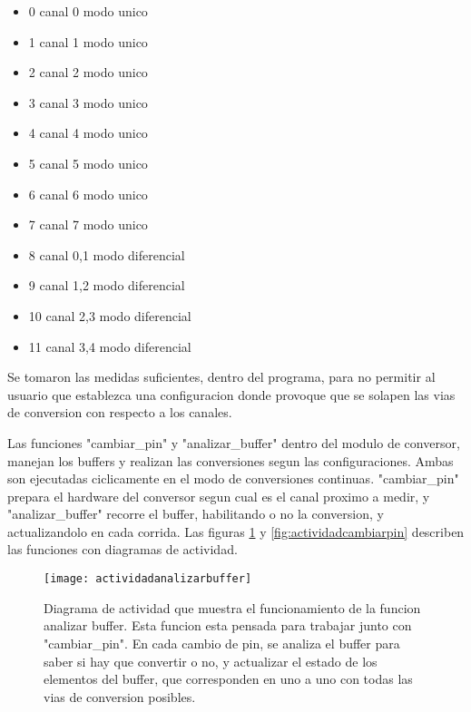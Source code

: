 \begin{itemize}
\item 0 \textrightarrow  canal 0 modo unico
\item 1 \textrightarrow  canal 1 modo unico
\item 2 \textrightarrow  canal 2 modo unico
\item 3 \textrightarrow  canal 3 modo unico
\item 4 \textrightarrow  canal 4 modo unico
\item 5 \textrightarrow  canal 5 modo unico
\item 6 \textrightarrow  canal 6 modo unico
\item 7 \textrightarrow  canal 7 modo unico
\item 8 \textrightarrow  canal 0,1 modo diferencial
\item 9 \textrightarrow  canal 1,2 modo diferencial
\item 10 \textrightarrow  canal 2,3 modo diferencial
\item 11 \textrightarrow  canal 3,4 modo diferencial
\end{itemize}


Se tomaron las medidas suficientes, dentro del programa, para no permitir al usuario que establezca una configuracion donde provoque que se solapen las vias de conversion con respecto a los canales. 

Las funciones "cambiar\_pin" y "analizar\_buffer" dentro del modulo de conversor, manejan los buffers y realizan las conversiones segun las configuraciones. Ambas son ejecutadas ciclicamente en el modo de conversiones continuas. "cambiar\_pin" prepara el hardware del conversor segun cual es el canal proximo a medir, y "analizar\_buffer" recorre el buffer, habilitando o no la conversion, y actualizandolo en cada corrida. Las figuras \ref{fig:actividadanalizarbuffer} y \ref{fig:actividadcambiarpin} describen las funciones con diagramas de actividad.
 
\begin{figure}[h]
  \centering
  \texttt{[image: actividadanalizarbuffer]}
  \caption[Diagrama de actividad de la funcion analizar buffer]{Diagrama de actividad que muestra el funcionamiento de la funcion analizar buffer. Esta funcion esta pensada para trabajar junto con "cambiar\_pin". En cada cambio de pin, se analiza el buffer para saber si hay que convertir o no, y actualizar el estado de los elementos del buffer, que corresponden en uno a uno con todas las vias de conversion posibles.}\label{fig:actividadanalizarbuffer}
\end{figure}




